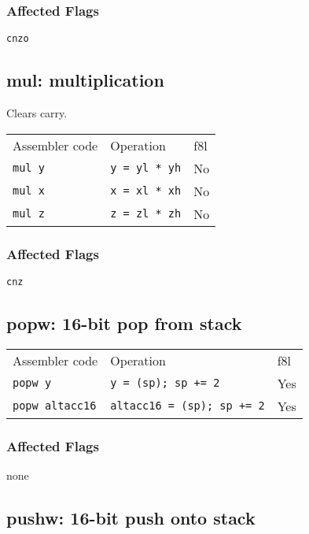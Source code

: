 \documentclass{book}
\begin{document}
\subsubsection*{Affected Flags}

\texttt{cnzo}


\subsection{mul: multiplication}

Clears carry.

\begin{tabular}{l l l}
Assembler code & Operation            & f8l \\
\texttt{mul y} & \texttt{y = yl * yh} & No \\
\texttt{mul x} & \texttt{x = xl * xh} & No \\
\texttt{mul z} & \texttt{z = zl * zh} & No \\
\end{tabular}

\subsubsection*{Affected Flags}

\texttt{cnz}


\subsection{popw: 16-bit pop from stack}

\begin{tabular}{l l l}
Assembler code         & Operation                         & f8l \\
\texttt{popw y}        & \texttt{y = (sp); sp += 2}        & Yes \\
\texttt{popw altacc16} & \texttt{altacc16 = (sp); sp += 2} & Yes \\
\end{tabular}

\subsubsection*{Affected Flags}

none


\subsection{pushw: 16-bit push onto stack}
\end{document}
